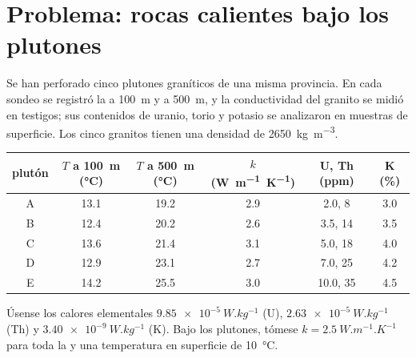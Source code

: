 \section{Problema: rocas calientes bajo los plutones}

\begin{problem}
\label{pb:b1:heat-budget:1}
Se han perforado cinco plutones graníticos de una misma provincia. En cada sondeo se registró la  a
\qty{100}{m} y a \qty{500}{m}, y la conductividad del granito se midió en testigos; sus contenidos de uranio, torio y
potasio se analizaron en muestras de superficie. Los cinco granitos tienen una densidad de \qty{2650}{kg.m^{-3}}.
\begin{center}
\small
\begin{tabular}{cccccc}
\hline
plutón & $T$ a \qty{100}{m} (\unit{\degreeCelsius}) & $T$ a \qty{500}{m} (\unit{\degreeCelsius}) & $k$ (\unit{W.m^{-1}.K^{-1}}) & U, Th (ppm) & K (\unit{\percent}) \\
\hline
A & 13.1 & 19.2 & 2.9 & 2.0, 8 & 3.0 \\
B & 12.4 & 20.2 & 2.6 & 3.5, 14 & 3.5 \\
C & 13.6 & 21.4 & 3.1 & 5.0, 18 & 4.0 \\
D & 12.9 & 23.1 & 2.7 & 7.0, 25 & 4.2 \\
E & 14.2 & 25.5 & 3.0 & 10.0, 35 & 4.5 \\
\hline
\end{tabular}
\end{center}
Úsense los calores elementales $\qty{9.85e-5}{W.kg^{-1}}$ (U), $\qty{2.63e-5}{W.kg^{-1}}$
(Th) y $\qty{3.40e-9}{W.kg^{-1}}$ (K). Bajo los plutones, tómese
$k = \qty{2.5}{W.m^{-1}.K^{-1}}$ para toda la  y una temperatura en superficie de
\qty{10}{\degreeCelsius}.


\end{problem}
